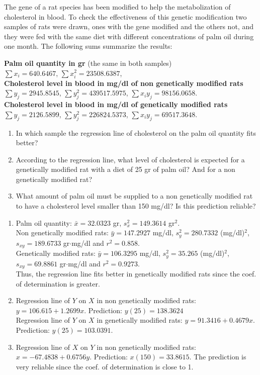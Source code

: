 {The gene of a rat species has been modified to help the metabolization of cholesterol in blood.
To check the effectiveness of this genetic modification two samples of rats were drawn, ones with the gene modified and the others not, and they were fed with the same diet with different concentrations of palm oil during one month. 
The following sums summarize the results:

\textbf{Palm oil quantity in gr} (the same in both samples)\\
$\sum x_i=640.6467$, $\sum x_i^2=23508.6387$,\\
\textbf{Cholesterol level in blood in mg/dl of non genetically modified rats}\\
$\sum y_j=2945.8545$, $\sum y_j^2=439517.5975$, $\sum x_iy_j=98156.0658$.\\
\textbf{Cholesterol level in blood in mg/dl of genetically modified rats}\\
$\sum y_j=2126.5899$, $\sum y_j^2=226824.5373$, $\sum x_iy_j=69517.3648$.

\begin{enumerate}
\item In which sample the regression line of cholesterol on the palm oil quantity fits better?
\item According to the regression line, what level of cholesterol is expected for a genetically modified rat with a diet of 25 gr of palm oil?
And for a non genetically modified rat?
\item What amount of palm oil must be supplied to a non genetically modified rat to have a cholesterol level smaller than 150 mg/dl?
Is this prediction reliable?
\end{enumerate}
}
{\begin{enumerate}
\item Palm oil quantity: $\bar x=32.0323$ gr,  $s^2_x=149.3614$ gr$^2$.\\
Non genetically modified rats: $\bar y=147.2927$ mg/dl,  $s^2_y=280.7332$ (mg/dl)$^2$, $s_{xy}=189.6733$ gr$\cdot$mg/dl and $r^2=0.858$.\\
Genetically modified rats: $\bar y=106.3295$ mg/dl,  $s^2_y=35.265$ (mg/dl)$^2$, $s_{xy}=69.8861$ gr$\cdot$mg/dl and $r^2=0.9273$.\\
Thus, the regression line fits better in genetically modified rats since the coef. of determination is greater.
\item Regression line of $Y$ on $X$ in non genetically modified rats: $y=106.615+1.2699x$. Prediction: $y(25)=138.3624$\\
Regression line of $Y$ on $X$ in genetically modified rats: $y=91.3416+0.4679x$. Prediction: $y(25)=103.0391$.
\item Regression line of $X$ on $Y$ in non genetically modified rats: $x=-67.4838+0.6756y$. Prediction: $x(150)=33.8615$. The prediction is very reliable since the coef. of determination is close to 1.
\end{enumerate}
}
{
}

